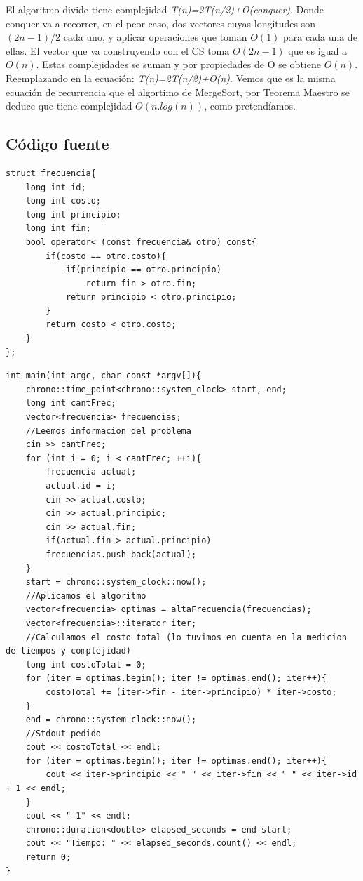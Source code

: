 El algoritmo divide tiene complejidad \emph{T(n)=2T(n/2)+O(conquer)}. Donde conquer va a recorrer, en el peor caso, dos vectores cuyas longitudes son $(2n-1)/2$ cada uno, y aplicar operaciones que toman $O(1)$ para cada una de ellas. El vector que va construyendo con el CS toma $O(2n-1)$ que es igual a $O(n)$. Estas complejidades se suman y por propiedades de O se obtiene $O(n)$.\\

Reemplazando en la ecuaci\'on: \emph{T(n)=2T(n/2)+O(n)}. Vemos que es la misma ecuaci\'on de recurrencia que el algortimo de MergeSort, por Teorema Maestro se deduce que tiene complejidad $O(n.log(n))$, como pretend\'iamos.

\newpage
\subsection{C\'odigo fuente}



	\begin{codesnippet}
	\begin{verbatim}
struct frecuencia{
    long int id;
    long int costo;
    long int principio;
    long int fin;
    bool operator< (const frecuencia& otro) const{
        if(costo == otro.costo){
            if(principio == otro.principio)
                return fin > otro.fin;
            return principio < otro.principio;
        }
        return costo < otro.costo;
    }
};
	\end{verbatim}
	\end{codesnippet}
	
		\begin{codesnippet}
	\begin{verbatim}
int main(int argc, char const *argv[]){
    chrono::time_point<chrono::system_clock> start, end;
    long int cantFrec;
    vector<frecuencia> frecuencias;
    //Leemos informacion del problema
    cin >> cantFrec;
    for (int i = 0; i < cantFrec; ++i){
        frecuencia actual;
        actual.id = i;
        cin >> actual.costo;
        cin >> actual.principio;
        cin >> actual.fin;
        if(actual.fin > actual.principio)
        frecuencias.push_back(actual);
    }
    start = chrono::system_clock::now();
    //Aplicamos el algoritmo
    vector<frecuencia> optimas = altaFrecuencia(frecuencias);
    vector<frecuencia>::iterator iter;
    //Calculamos el costo total (lo tuvimos en cuenta en la medicion de tiempos y complejidad)
    long int costoTotal = 0;
    for (iter = optimas.begin(); iter != optimas.end(); iter++){
        costoTotal += (iter->fin - iter->principio) * iter->costo;
    }
    end = chrono::system_clock::now();
    //Stdout pedido
    cout << costoTotal << endl;
    for (iter = optimas.begin(); iter != optimas.end(); iter++){
        cout << iter->principio << " " << iter->fin << " " << iter->id + 1 << endl;
    }
    cout << "-1" << endl;
    chrono::duration<double> elapsed_seconds = end-start;
    cout << "Tiempo: " << elapsed_seconds.count() << endl;
    return 0;
}
	\end{verbatim}
	\end{codesnippet}
	
